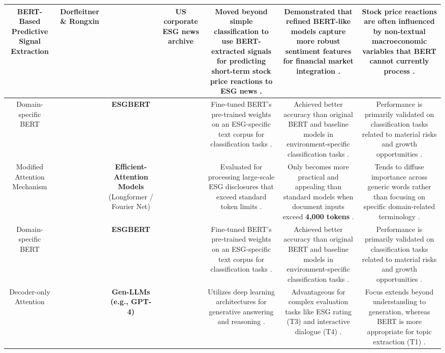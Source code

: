 \documentclass{article}
\begin{document}
\begin{table}[h!]
\begin{tabular}{|c|c|c|c|c|c|c|}
\textbf{BERT-Based Predictive Signal Extraction} & Dorfleitner \& Rongxin  \parencite{gregor_dorfleitner_320f79a0} & ~ & US corporate ESG news archive  \parencite{gregor_dorfleitner_320f79a0} & Moved beyond simple classification to use BERT-extracted signals for predicting short-term stock price reactions to ESG news  \parencite{gregor_dorfleitner_320f79a0}. & Demonstrated that refined BERT-like models capture more robust sentiment features for financial market integration  \parencite{gregor_dorfleitner_320f79a0}. & Stock price reactions are often influenced by non-textual macroeconomic variables that BERT cannot currently process  \parencite{gregor_dorfleitner_320f79a0}. \\ \hline
Domain-specific BERT & ~ & \textbf{ESGBERT}  \parencite{srishti_mehra_9e899b9f} & ~ & Fine-tuned BERT's pre-trained weights on an ESG-specific text corpus for classification tasks  \parencite{srishti_mehra_9e899b9f}. & Achieved better accuracy than original BERT and baseline models in environment-specific classification tasks  \parencite{srishti_mehra_9e899b9f}. & Performance is primarily validated on classification tasks related to material risks and growth opportunities  \parencite{srishti_mehra_9e899b9f}. \\ \hline
Modified Attention Mechanism & ~ & \textbf{Efficient-Attention Models} (Longformer / Fourier Net)  \parencite{yasser_elouargui_76ecc66a} & ~ & Evaluated for processing large-scale ESG disclosures that exceed standard token limits  \parencite{yasser_elouargui_76ecc66a}. & Only becomes more practical and appealing than standard models when document inputs exceed \textbf{4,000 tokens}  \parencite{yasser_elouargui_76ecc66a}. & Tends to diffuse importance across generic words rather than focusing on specific domain-related terminology  \parencite{yasser_elouargui_76ecc66a}. \\ \hline
Domain-specific BERT & ~ & \textbf{ESGBERT}  \parencite{srishti_mehra_9e899b9f} & ~ & Fine-tuned BERT's pre-trained weights on an ESG-specific text corpus for classification tasks  \parencite{srishti_mehra_9e899b9f}. & Achieved better accuracy than original BERT and baseline models in environment-specific classification tasks  \parencite{srishti_mehra_9e899b9f}. & Performance is primarily validated on classification tasks related to material risks and growth opportunities  \parencite{srishti_mehra_9e899b9f}. \\ \hline
Decoder-only Attention & ~ & \textbf{Gen-LLMs (e.g., GPT-4)}  \parencite{keane_ong_2746d04f} & ~ & Utilizes deep learning architectures for generative answering and reasoning  \parencite{keane_ong_2746d04f}. & Advantageous for complex evaluation tasks like ESG rating (T3) and interactive dialogue (T4)  \parencite{keane_ong_2746d04f}. & Focus extends beyond understanding to generation, whereas BERT is more appropriate for topic extraction (T1)  \parencite{keane_ong_2746d04f}. \\ \hline

\end{tabular}
\end{table}
\end{document}
